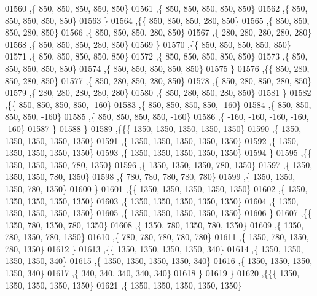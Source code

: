 \begin{DoxyCode}
01560    ,\{   850,   850,   850,   850,   850\}
01561    ,\{   850,   850,   850,   850,   850\}
01562    ,\{   850,   850,   850,   850,   850\}
01563    \}
01564   ,\{\{   850,   850,   850,   280,   850\}
01565    ,\{   850,   850,   850,   280,   850\}
01566    ,\{   850,   850,   850,   280,   850\}
01567    ,\{   280,   280,   280,   280,   280\}
01568    ,\{   850,   850,   850,   280,   850\}
01569    \}
01570   ,\{\{   850,   850,   850,   850,   850\}
01571    ,\{   850,   850,   850,   850,   850\}
01572    ,\{   850,   850,   850,   850,   850\}
01573    ,\{   850,   850,   850,   850,   850\}
01574    ,\{   850,   850,   850,   850,   850\}
01575    \}
01576   ,\{\{   850,   280,   850,   280,   850\}
01577    ,\{   850,   280,   850,   280,   850\}
01578    ,\{   850,   280,   850,   280,   850\}
01579    ,\{   280,   280,   280,   280,   280\}
01580    ,\{   850,   280,   850,   280,   850\}
01581    \}
01582   ,\{\{   850,   850,   850,   850,  -160\}
01583    ,\{   850,   850,   850,   850,  -160\}
01584    ,\{   850,   850,   850,   850,  -160\}
01585    ,\{   850,   850,   850,   850,  -160\}
01586    ,\{  -160,  -160,  -160,  -160,  -160\}
01587    \}
01588   \}
01589  ,\{\{\{  1350,  1350,  1350,  1350,  1350\}
01590    ,\{  1350,  1350,  1350,  1350,  1350\}
01591    ,\{  1350,  1350,  1350,  1350,  1350\}
01592    ,\{  1350,  1350,  1350,  1350,  1350\}
01593    ,\{  1350,  1350,  1350,  1350,  1350\}
01594    \}
01595   ,\{\{  1350,  1350,  1350,   780,  1350\}
01596    ,\{  1350,  1350,  1350,   780,  1350\}
01597    ,\{  1350,  1350,  1350,   780,  1350\}
01598    ,\{   780,   780,   780,   780,   780\}
01599    ,\{  1350,  1350,  1350,   780,  1350\}
01600    \}
01601   ,\{\{  1350,  1350,  1350,  1350,  1350\}
01602    ,\{  1350,  1350,  1350,  1350,  1350\}
01603    ,\{  1350,  1350,  1350,  1350,  1350\}
01604    ,\{  1350,  1350,  1350,  1350,  1350\}
01605    ,\{  1350,  1350,  1350,  1350,  1350\}
01606    \}
01607   ,\{\{  1350,   780,  1350,   780,  1350\}
01608    ,\{  1350,   780,  1350,   780,  1350\}
01609    ,\{  1350,   780,  1350,   780,  1350\}
01610    ,\{   780,   780,   780,   780,   780\}
01611    ,\{  1350,   780,  1350,   780,  1350\}
01612    \}
01613   ,\{\{  1350,  1350,  1350,  1350,   340\}
01614    ,\{  1350,  1350,  1350,  1350,   340\}
01615    ,\{  1350,  1350,  1350,  1350,   340\}
01616    ,\{  1350,  1350,  1350,  1350,   340\}
01617    ,\{   340,   340,   340,   340,   340\}
01618    \}
01619   \}
01620  ,\{\{\{  1350,  1350,  1350,  1350,  1350\}
01621    ,\{  1350,  1350,  1350,  1350,  1350\}

\end{DoxyCode}
